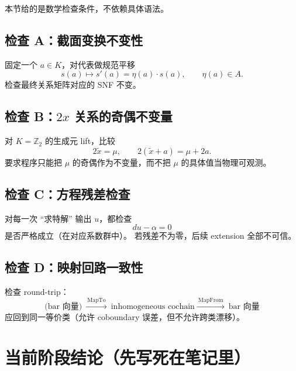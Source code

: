 \documentclass[a4paper,fontset=ubuntu,12pt]{ctexart}
\begin{document}
本节给的是数学检查条件，不依赖具体语法。

\subsection{检查 A：截面变换不变性}

固定一个 $a\in K$，对代表做规范平移
\begin{equation}
s(a)\mapsto s'(a)=\eta(a)\cdot s(a),\qquad \eta(a)\in A.
\label{eq:section-test}
\end{equation}
检查最终关系矩阵对应的 SNF 不变。

\subsection{检查 B：$2x$ 关系的奇偶不变量}

对 $K=\mathbb{Z}_2$ 的生成元 lift，比较
\begin{equation}
2\tilde{x}=\mu,\qquad 2(\tilde{x}+a)=\mu+2a.
\label{eq:2x-test}
\end{equation}
要求程序只能把 $\mu$ 的奇偶作为不变量，而不把 $\mu$ 的具体值当物理可观测。

\subsection{检查 C：方程残差检查}

对每一次 ``求特解'' 输出 $u$，都检查
\begin{equation}
d u - \alpha = 0
\label{eq:residual}
\end{equation}
是否严格成立（在对应系数群中）。
若残差不为零，后续 extension 全部不可信。

\subsection{检查 D：映射回路一致性}

检查 round-trip：
\begin{equation}
\text{(bar 向量)}\ \xrightarrow{\ \mathrm{MapTo}\ }\ \text{inhomogeneous cochain}
\xrightarrow{\ \mathrm{MapFrom}\ }\ \text{bar 向量}
\label{eq:roundtrip}
\end{equation}
应回到同一等价类（允许 coboundary 误差，但不允许跨类漂移）。

\section{当前阶段结论（先写死在笔记里）}
\label{sec:current-conclusion}
\end{document}
